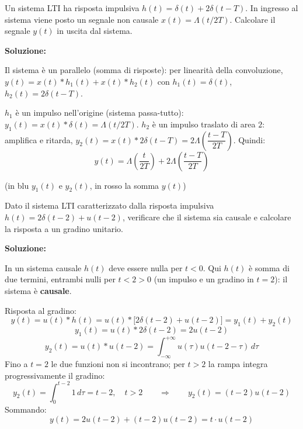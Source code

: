 \documentclass[12pt, a4paper]{article}
\begin{document}
\bigskip

\begin{tcolorbox}[colback=lightergray!10, colframe=tocsec, title=\textbf{Esercizio 7}]
Un sistema LTI ha risposta impulsiva $h(t)=\delta(t)+2\delta(t-T)$. In ingresso al sistema viene posto un segnale non causale $x(t)=\Lambda(t/2T)$. Calcolare il segnale $y(t)$ in uscita dal sistema.
\end{tcolorbox}

\textbf{Soluzione:}

Il sistema è un parallelo (somma di risposte): per linearità della convoluzione, $y(t)=x(t)*h_1(t)+x(t)*h_2(t)$ con $h_1(t)=\delta(t)$, $h_2(t)=2\delta(t-T)$.

$h_1$ è un impulso nell'origine (sistema passa-tutto): $y_1(t)=x(t)*\delta(t)=\Lambda(t/2T)$. $h_2$ è un impulso traslato di area $2$: amplifica e ritarda, $y_2(t)=x(t)*2\delta(t-T)=2\Lambda\!\left(\dfrac{t-T}{2T}\right)$. Quindi:
$$y(t) = \Lambda\!\left(\frac{t}{2T}\right)+2\Lambda\!\left(\frac{t-T}{2T}\right)$$

\begin{center}
\end{center}
(in blu $y_1(t)$ e $y_2(t)$, in rosso la somma $y(t)$)

\bigskip

\begin{tcolorbox}[colback=lightergray!10, colframe=tocsec, title=\textbf{Esercizio 8}]
Dato il sistema LTI caratterizzato dalla risposta impulsiva $h(t)=2\delta(t-2)+u(t-2)$, verificare che il sistema sia causale e calcolare la risposta a un gradino unitario.
\end{tcolorbox}

\textbf{Soluzione:}

In un sistema causale $h(t)$ deve essere nulla per $t<0$. Qui $h(t)$ è somma di due termini, entrambi nulli per $t<2>0$ (un impulso e un gradino in $t=2$): il sistema è \textbf{causale}.

Risposta al gradino:
$$y(t) = u(t)*h(t) = u(t)*\big[2\delta(t-2)+u(t-2)\big] = y_1(t)+y_2(t)$$
$$y_1(t) = u(t)*2\delta(t-2) = 2u(t-2)$$
$$y_2(t) = u(t)*u(t-2) = \int_{-\infty}^{+\infty}u(\tau)u(t-2-\tau)\,d\tau$$
Fino a $t=2$ le due funzioni non si incontrano; per $t>2$ la rampa integra progressivamente il gradino:
$$y_2(t) = \int_0^{t-2}1\,d\tau = t-2,\quad t>2 \qquad\Longrightarrow\qquad y_2(t)=(t-2)u(t-2)$$
Sommando:
$$y(t) = 2u(t-2)+(t-2)u(t-2) = t\cdot u(t-2)$$
\end{document}
